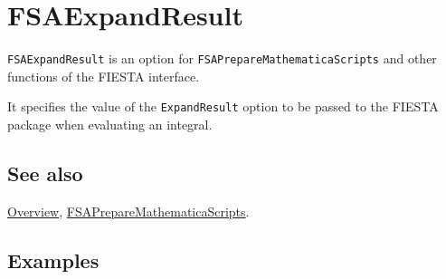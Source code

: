 \documentclass[../FeynHelpersManual.tex]{subfiles}
\begin{document}
\hypertarget{fsaexpandresult}{
\section{FSAExpandResult}\label{fsaexpandresult}}

\texttt{FSAExpandResult} is an option for
\texttt{FSAPrepareMathematicaScripts} and other functions of the FIESTA
interface.

It specifies the value of the \texttt{ExpandResult} option to be passed
to the FIESTA package when evaluating an integral.

\subsection{See also}

\hyperlink{toc}{Overview},
\hyperlink{fsapreparemathematicascripts}{FSAPrepareMathematicaScripts}.

\subsection{Examples}
\end{document}
